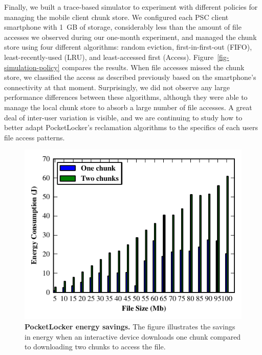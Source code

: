 Finally, we built a trace-based simulator to experiment with different
policies for managing the mobile client chunk store. We configured each PSC
client smartphone with 1~GB of storage, considerably less than the amount of
file accesses we observed during our one-month experiment, and managed the
chunk store using four different algorithms: random eviction,
first-in-first-out (FIFO), least-recently-used (LRU), and least-accessed
first (Access). Figure~\ref{fig-simulation-policy} compares the results. When
file accesses missed the chunk store, we classified the access as described
previously based on the smartphone's connectivity at that moment.
Surprisingly, we did not observe any large performance differences between
these algorithms, although they were able to manage the local
chunk store to absorb a large number of file accesses. A great
deal of inter-user variation is visible, and we are continuing to study
how to better adapt PocketLocker's reclamation algorithms to the specifics of
each users file access patterns.
\begin{figure}[t]
  
  \includegraphics[scale=.97]{./figures/energysavings.pdf}
  
  \caption{\small \textbf{PocketLocker energy savings.} The figure
    illustrates the savings in energy when an interactive device downloads
  one chunk compared to downloading two chunks to access the file.}
  
  \label{fig-evaluation-energysavings}

  \vspace*{-0.2in}
\end{figure}


